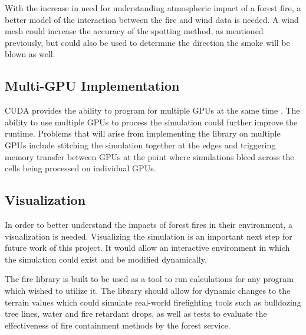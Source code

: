 With the increase in need for understanding atmospheric impact of a forest fire, a better model of the interaction between the fire and wind data is needed. A wind mesh could increase the accuracy of the spotting method, as mentioned previously, but could also be used to determine the direction the smoke will be blown as well.

\subsection{Multi-GPU Implementation} 
CUDA provides the ability to program for multiple GPUs at the same time \cite{cuda}. The ability to use multiple GPUs to process the simulation could further improve the runtime. Problems that will arise from implementing the library on multiple GPUs include stitching the simulation together at the edges and triggering memory transfer between GPUs at the point where simulations bleed across the cells being processed on individual GPUs. 

\subsection{Visualization}
In order to better understand the impacts of forest fires in their environment, a visualization is needed. Visualizing the simulation is an important next step for future work of this project. It would allow an interactive environment in which the simulation could exist and be modified dynamically. 

The fire library is built to be used as a tool to run calculations for any program which wished to utilize it. The library should allow for dynamic changes to the terrain values which could simulate real-world firefighting tools such as bulldozing tree lines, water and fire retardant drops, as well as tests to evaluate the effectiveness of fire containment methods by the forest service. 